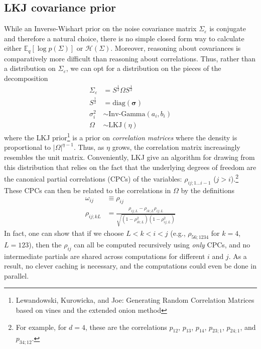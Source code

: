\documentclass[11pt]{article}
\begin{document}
\subsection{LKJ covariance prior}
While an Inverse-Wishart prior on the noise covariance matrix $\Sigma_\varepsilon$ is conjugate and therefore a natural choice, there is no simple closed form way to calculate either $\mathbb{E}_q[\log p(\Sigma)]$ or $\mathcal{H}(\Sigma)$. Moreover, reasoning about covariances is comparatively more difficult than reasoning about correlations. Thus, rather than a distribution on $\Sigma_\varepsilon$, we can opt for a distribution on the pieces of the decomposition
\begin{align}
    \label{sigeps_def}
    \Sigma_\varepsilon &= S^{\frac{1}{2}} \Omega S^{\frac{1}{2}} \\
    S^{\frac{1}{2}} &= \mathrm{diag}(\boldsymbol{\sigma}) \\
    \sigma^2_i &\sim \text{Inv-Gamma}(a_i, b_i) \\
    \Omega &\sim \mathrm{LKJ}(\eta)
\end{align}
where the LKJ prior\footnote{Lewandowski, Kurowicka, and Joe: Generating Random Correlation Matrices based on vines and the extended onion method} is a prior on \emph{correlation matrices} where the density is proportional to $ |\Omega|^{\eta - 1}$. Thus, as $\eta$ grows, the correlation matrix increasingly resembles the unit matrix. Conveniently, LKJ give an algorithm for drawing from this distribution that relies on the fact that the underlying degrees of freedom are the canonical partial correlations (CPCs) of the variables: $\rho_{ij;1\ldots i - 1}$ ($j > i$).\footnote{For example, for $d=4$, these are the correlations $p_{12}$, $p_{13}$, $p_{14}$, $p_{23;1}$, $p_{24;1}$, and $p_{34;12}$.} These CPCs can then be related to the correlations in $\Omega$ by the definitions
\begin{align}
    \omega_{ij} &\equiv \rho_{ij} \\
    \label{rho_recursion}
    \rho_{ij;kL} &= \frac{\rho_{ij;L} - \rho_{ik;L}\rho_{ij;L}}
    {\sqrt{(1 - \rho_{ik;L}^2)(1 - \rho_{ij;L}^2)}}
\end{align}
In fact, one can show that if we choose $L < k < i < j$ (e.g., $\rho_{56;1234}$ for $k=4$, $L = 123$), then the $\rho_{ij}$ can all be computed recursively using \emph{only} CPCs, and no intermediate partials are shared across computations for different $i$ and $j$. As a result, no clever caching is necessary, and the computations could even be done in parallel.
\end{document}
